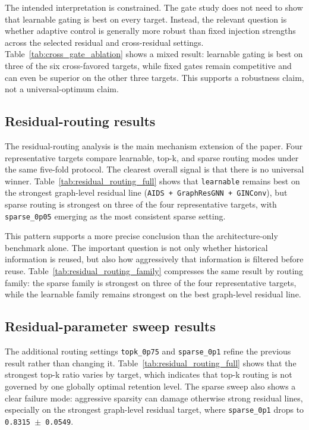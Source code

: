 The intended interpretation is constrained. The gate study does not need to show that learnable gating is best on every target. Instead, the relevant question is whether adaptive control is generally more robust than fixed injection strengths across the selected residual and cross-residual settings. Table~\ref{tab:cross_gate_ablation} shows a mixed result: learnable gating is best on three of the six cross-favored targets, while fixed gates remain competitive and can even be superior on the other three targets. This supports a robustness claim, not a universal-optimum claim.

\subsection*{Residual-routing results}



The residual-routing analysis is the main mechanism extension of the paper. Four representative targets compare learnable, top-k, and sparse routing modes under the same five-fold protocol. The clearest overall signal is that there is no universal winner. Table~\ref{tab:residual_routing_full} shows that \texttt{learnable} remains best on the strongest graph-level residual line (\texttt{AIDS + GraphResGNN + GINConv}), but sparse routing is strongest on three of the four representative targets, with \texttt{sparse\_0p05} emerging as the most consistent sparse setting.

This pattern supports a more precise conclusion than the architecture-only benchmark alone. The important question is not only whether historical information is reused, but also how aggressively that information is filtered before reuse. Table~\ref{tab:residual_routing_family} compresses the same result by routing family: the sparse family is strongest on three of the four representative targets, while the learnable family remains strongest on the best graph-level residual line.

\subsection*{Residual-parameter sweep results}

The additional routing settings \texttt{topk\_0p75} and \texttt{sparse\_0p1} refine the previous result rather than changing it. Table~\ref{tab:residual_routing_full} shows that the strongest top-k ratio varies by target, which indicates that top-k routing is not governed by one globally optimal retention level. The sparse sweep also shows a clear failure mode: aggressive sparsity can damage otherwise strong residual lines, especially on the strongest graph-level residual target, where \texttt{sparse\_0p1} drops to \texttt{0.8315 $\pm$ 0.0549}.

